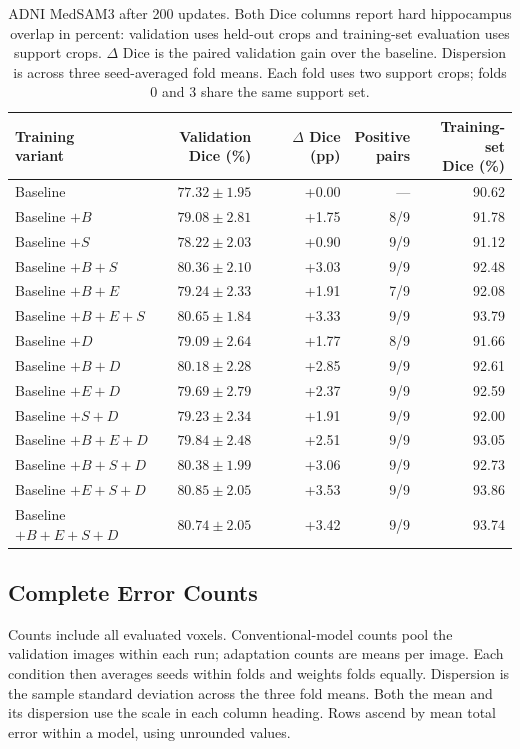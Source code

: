 \documentclass[12pt,a4paper]{article}
\begin{document}
\FloatBarrier
\begin{table}[htbp]
\centering\small{}
\setlength{\tabcolsep}{5pt}
\renewcommand{\arraystretch}{1.15}
\begin{tabular}{@{}lrrrr@{}}
\hline
\shortstack{Training\\variant} & \shortstack{Validation\\Dice (\%)} & \shortstack{$\Delta$ Dice\\(pp)} & \shortstack{Positive\\pairs} & \shortstack{Training-set\\Dice (\%)} \\
\hline
Baseline & $77.32\pm1.95$ & +0.00 & --- & 90.62 \\
Baseline $+B$ & $79.08\pm2.81$ & +1.75 & 8/9 & 91.78 \\
Baseline $+S$ & $78.22\pm2.03$ & +0.90 & 9/9 & 91.12 \\
Baseline $+B+S$ & $80.36\pm2.10$ & +3.03 & 9/9 & 92.48 \\
Baseline $+B+E$ & $79.24\pm2.33$ & +1.91 & 7/9 & 92.08 \\
Baseline $+B+E+S$ & $80.65\pm1.84$ & +3.33 & 9/9 & 93.79 \\
Baseline $+D$ & $79.09\pm2.64$ & +1.77 & 8/9 & 91.66 \\
Baseline $+B+D$ & $80.18\pm2.28$ & +2.85 & 9/9 & 92.61 \\
Baseline $+E+D$ & $79.69\pm2.79$ & +2.37 & 9/9 & 92.59 \\
Baseline $+S+D$ & $79.23\pm2.34$ & +1.91 & 9/9 & 92.00 \\
Baseline $+B+E+D$ & $79.84\pm2.48$ & +2.51 & 9/9 & 93.05 \\
Baseline $+B+S+D$ & $80.38\pm1.99$ & +3.06 & 9/9 & 92.73 \\
Baseline $+E+S+D$ & $80.85\pm2.05$ & +3.53 & 9/9 & 93.86 \\
Baseline $+B+E+S+D$ & $80.74\pm2.05$ & +3.42 & 9/9 & 93.74 \\
\hline
\end{tabular}
\caption{ADNI MedSAM3 after 200 updates. Both Dice columns report hard
hippocampus overlap in percent: validation uses held-out crops and
training-set evaluation uses support crops. $\Delta$ Dice is the paired
validation gain over the baseline. Dispersion is across three
seed-averaged fold means. Each fold uses two support crops; folds 0 and 3
share the same support set.}
\label{tab:medsam-adni-noaug}
\end{table}
\FloatBarrier
\subsection{Complete Error Counts}\label{sec:complete-error-tables}
Counts include all evaluated voxels. Conventional-model counts pool the
validation images within each run; adaptation counts are means per image.
Each condition then averages seeds within folds and weights folds equally.
Dispersion is the sample standard deviation across the three fold means.
Both the mean and its dispersion use the scale in each column heading.
Rows ascend by mean total error within a model, using unrounded values.
\end{document}
